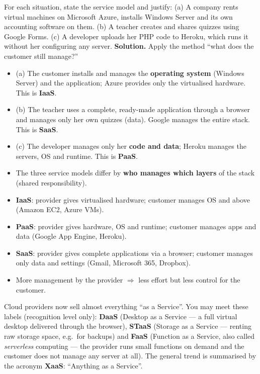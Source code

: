 \documentclass[11pt]{article}
\begin{document}
\begin{exoresolu}
For each situation, state the service model and justify: (a) A company rents virtual machines on Microsoft Azure, installs Windows Server and its own accounting software on them. (b) A teacher creates and shares quizzes using Google Forms. (c) A developer uploads her PHP code to Heroku, which runs it without her configuring any server.
\tcblower
\textbf{Solution.} Apply the method ``what does the customer still manage?''
\begin{itemize}
\item (a) The customer installs and manages the \textbf{operating system} (Windows Server) and the application; Azure provides only the virtualised hardware. This is \textbf{IaaS}.
\item (b) The teacher uses a complete, ready-made application through a browser and manages only her own quizzes (data). Google manages the entire stack. This is \textbf{SaaS}.
\item (c) The developer manages only her \textbf{code and data}; Heroku manages the servers, OS and runtime. This is \textbf{PaaS}.
\end{itemize}
\end{exoresolu}

\begin{aretenir}
\begin{itemize}
\item The three service models differ by \textbf{who manages which layers} of the stack (shared responsibility).
\item \textbf{IaaS}: provider gives virtualised hardware; customer manages OS and above (Amazon EC2, Azure VMs).
\item \textbf{PaaS}: provider gives hardware, OS and runtime; customer manages apps and data (Google App Engine, Heroku).
\item \textbf{SaaS}: provider gives complete applications via a browser; customer manages only data and settings (Gmail, Microsoft 365, Dropbox).
\item More management by the provider $\Rightarrow$ less effort but less control for the customer.
\end{itemize}
\end{aretenir}

\begin{savaistu}
Cloud providers now sell almost everything ``as a Service''. You may meet these labels (recognition level only): \textbf{DaaS} (Desktop as a Service --- a full virtual desktop delivered through the browser), \textbf{STaaS} (Storage as a Service --- renting raw storage space, e.g.\ for backups) and \textbf{FaaS} (Function as a Service, also called \emph{serverless} computing --- the provider runs small functions on demand and the customer does not manage any server at all). The general trend is summarised by the acronym \textbf{XaaS}: ``Anything as a Service''.
\end{savaistu}
\end{document}
